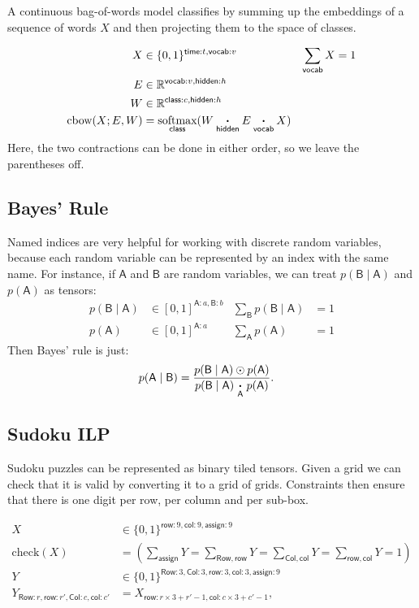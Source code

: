 \documentclass{article}
\newcommand{\name}[1]{\mathsf{#1}}
\newcommand{\ndot}[1]{\mathbin{\mathop{\thinspace\boldsymbol\cdot\thinspace}\limits_{\name{#1}}}}
\newcommand{\nsum}[1]{\mathop{\sum}_{\name{#1}}}
\newcommand{\nfun}[2]{\mathop{\text{#2}}\limits_{\name{#1}}}
\newcommand{\reals}{\mathbb{R}}
\begin{document}
A continuous bag-of-words model classifies by summing up the embeddings of a sequence of words $X$ and then projecting them to the space of classes. 

\begin{align*} 
X &\in \{0, 1\}^{{\name{time}:t, \name{vocab}:v}} & \nsum{vocab} X &= 1\\
E &\in \reals^{{\name{vocab}:v, \name{hidden}:h}}\\
W &\in \reals^{{\name{class}:c, \name{hidden}:h}}\\
\text{cbow}(X; E, W) &= \nfun{class}{softmax} (W \ndot{hidden} E \ndot{vocab} X)
\end{align*}
Here, the two contractions can be done in either order, so we leave the parentheses off.

\subsection{Bayes' Rule}

Named indices are very helpful for working with discrete random variables, because each random variable can be represented by an index with the same name. For instance, if $\name{A}$ and $\name{B}$ are random variables, we can treat $p(\name{B} \mid \name{A})$ and $p(\name{A})$ as tensors:
\begin{align*} 
p(\name{B} \mid \name{A}) &\in [0, 1]^{\name{A}:a, \name{B}:b} & \nsum{B} p(\name{B}\mid \name{A}) &= 1 \\
p(\name{A}) &\in [0, 1]^{\name{A}:a} & \nsum{A} p(\name{A}) &= 1
\end{align*}
Then Bayes' rule is just:
\begin{align*}
p(\name{A} \mid \name{B}) &= \frac{p(\name{B} \mid \name{A}) \odot p(\name{A})}{p(\name{B} \mid \name{A}) \ndot{A} p(\name{A})}.
\end{align*}

\subsection{Sudoku ILP}

Sudoku puzzles can be represented as  binary tiled tensors.
Given a grid we can check that it is valid by converting it to a grid of grids. 
Constraints then ensure that there is one digit per row, per column and per sub-box. 

\begin{align*} 
X &\in \{0, 1\}^{\name{row}: 9, \name{col}:9, \name{assign}:9}  \\
\text{check}(X) &=
\left(\nsum{assign} Y = 
\nsum{Row,row} Y = 
\nsum{Col, col} Y =  
\nsum{row, col} Y = 1 \right) \\
Y &\in \{0, 1\}^{\name{Row}: 3, \name{Col}:3, \name{row}: 3, \name{col}:3, \name{assign}:9}  \\
Y_{\name{Row}:r, \name{row}:r', \name{Col}:c, \name{col}:c'} &= X_{\name{row}:r\times 3 + r'-1, \name{col}:c\times3 + c'-1}, 
\end{align*} 
\end{document}
